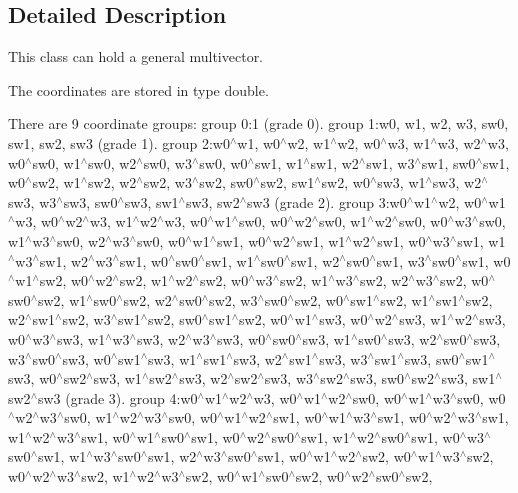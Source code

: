 \subsection{Detailed Description}
This class can hold a general multivector.

The coordinates are stored in type double.

There are 9 coordinate groups\-: group 0\-:1 (grade 0). group 1\-:w0, w1, w2, w3, sw0, sw1, sw2, sw3 (grade 1). group 2\-:w0$^\wedge$w1, w0$^\wedge$w2, w1$^\wedge$w2, w0$^\wedge$w3, w1$^\wedge$w3, w2$^\wedge$w3, w0$^\wedge$sw0, w1$^\wedge$sw0, w2$^\wedge$sw0, w3$^\wedge$sw0, w0$^\wedge$sw1, w1$^\wedge$sw1, w2$^\wedge$sw1, w3$^\wedge$sw1, sw0$^\wedge$sw1, w0$^\wedge$sw2, w1$^\wedge$sw2, w2$^\wedge$sw2, w3$^\wedge$sw2, sw0$^\wedge$sw2, sw1$^\wedge$sw2, w0$^\wedge$sw3, w1$^\wedge$sw3, w2$^\wedge$sw3, w3$^\wedge$sw3, sw0$^\wedge$sw3, sw1$^\wedge$sw3, sw2$^\wedge$sw3 (grade 2). group 3\-:w0$^\wedge$w1$^\wedge$w2, w0$^\wedge$w1$^\wedge$w3, w0$^\wedge$w2$^\wedge$w3, w1$^\wedge$w2$^\wedge$w3, w0$^\wedge$w1$^\wedge$sw0, w0$^\wedge$w2$^\wedge$sw0, w1$^\wedge$w2$^\wedge$sw0, w0$^\wedge$w3$^\wedge$sw0, w1$^\wedge$w3$^\wedge$sw0, w2$^\wedge$w3$^\wedge$sw0, w0$^\wedge$w1$^\wedge$sw1, w0$^\wedge$w2$^\wedge$sw1, w1$^\wedge$w2$^\wedge$sw1, w0$^\wedge$w3$^\wedge$sw1, w1$^\wedge$w3$^\wedge$sw1, w2$^\wedge$w3$^\wedge$sw1, w0$^\wedge$sw0$^\wedge$sw1, w1$^\wedge$sw0$^\wedge$sw1, w2$^\wedge$sw0$^\wedge$sw1, w3$^\wedge$sw0$^\wedge$sw1, w0$^\wedge$w1$^\wedge$sw2, w0$^\wedge$w2$^\wedge$sw2, w1$^\wedge$w2$^\wedge$sw2, w0$^\wedge$w3$^\wedge$sw2, w1$^\wedge$w3$^\wedge$sw2, w2$^\wedge$w3$^\wedge$sw2, w0$^\wedge$sw0$^\wedge$sw2, w1$^\wedge$sw0$^\wedge$sw2, w2$^\wedge$sw0$^\wedge$sw2, w3$^\wedge$sw0$^\wedge$sw2, w0$^\wedge$sw1$^\wedge$sw2, w1$^\wedge$sw1$^\wedge$sw2, w2$^\wedge$sw1$^\wedge$sw2, w3$^\wedge$sw1$^\wedge$sw2, sw0$^\wedge$sw1$^\wedge$sw2, w0$^\wedge$w1$^\wedge$sw3, w0$^\wedge$w2$^\wedge$sw3, w1$^\wedge$w2$^\wedge$sw3, w0$^\wedge$w3$^\wedge$sw3, w1$^\wedge$w3$^\wedge$sw3, w2$^\wedge$w3$^\wedge$sw3, w0$^\wedge$sw0$^\wedge$sw3, w1$^\wedge$sw0$^\wedge$sw3, w2$^\wedge$sw0$^\wedge$sw3, w3$^\wedge$sw0$^\wedge$sw3, w0$^\wedge$sw1$^\wedge$sw3, w1$^\wedge$sw1$^\wedge$sw3, w2$^\wedge$sw1$^\wedge$sw3, w3$^\wedge$sw1$^\wedge$sw3, sw0$^\wedge$sw1$^\wedge$sw3, w0$^\wedge$sw2$^\wedge$sw3, w1$^\wedge$sw2$^\wedge$sw3, w2$^\wedge$sw2$^\wedge$sw3, w3$^\wedge$sw2$^\wedge$sw3, sw0$^\wedge$sw2$^\wedge$sw3, sw1$^\wedge$sw2$^\wedge$sw3 (grade 3). group 4\-:w0$^\wedge$w1$^\wedge$w2$^\wedge$w3, w0$^\wedge$w1$^\wedge$w2$^\wedge$sw0, w0$^\wedge$w1$^\wedge$w3$^\wedge$sw0, w0$^\wedge$w2$^\wedge$w3$^\wedge$sw0, w1$^\wedge$w2$^\wedge$w3$^\wedge$sw0, w0$^\wedge$w1$^\wedge$w2$^\wedge$sw1, w0$^\wedge$w1$^\wedge$w3$^\wedge$sw1, w0$^\wedge$w2$^\wedge$w3$^\wedge$sw1, w1$^\wedge$w2$^\wedge$w3$^\wedge$sw1, w0$^\wedge$w1$^\wedge$sw0$^\wedge$sw1, w0$^\wedge$w2$^\wedge$sw0$^\wedge$sw1, w1$^\wedge$w2$^\wedge$sw0$^\wedge$sw1, w0$^\wedge$w3$^\wedge$sw0$^\wedge$sw1, w1$^\wedge$w3$^\wedge$sw0$^\wedge$sw1, w2$^\wedge$w3$^\wedge$sw0$^\wedge$sw1, w0$^\wedge$w1$^\wedge$w2$^\wedge$sw2, w0$^\wedge$w1$^\wedge$w3$^\wedge$sw2, w0$^\wedge$w2$^\wedge$w3$^\wedge$sw2, w1$^\wedge$w2$^\wedge$w3$^\wedge$sw2, w0$^\wedge$w1$^\wedge$sw0$^\wedge$sw2, w0$^\wedge$w2$^\wedge$sw0$^\wedge$sw2, 